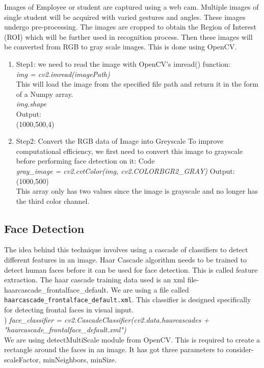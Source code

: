  Images of Employee or student are captured using a web cam. Multiple images of single student will be acquired with varied gestures and  angles.  These  images  undergo  pre-processing.  The images  are cropped  to obtain  the  Region of  Interest (ROI) which will be further used in recognition process. Then these  images  will  be  converted  from  RGB  to  gray  scale images. This is done using OpenCV. 
\begin{enumerate}
    \item Step1: we need to read the image with OpenCV’s imread() function:
    \\
  \emph{img = cv2.imread(imagePath)} \\
    This will load the image from the specified file path and return it in the form of a Numpy array. \\
   \emph{img.shape} \\
    Output:\\
    (1000,500,4)
    \item Step2: Convert the RGB data of Image into Greyscale
    To improve computational efficiency, we first need to convert this image to grayscale before performing face detection on it:
    Code \\
   \emph{gray\_image = cv2.cvtColor(img, cv2.COLORBGR2\_GRAY)} 
    Output:
    \\
    (1000,500)\\
    This array only has two values since the image is grayscale and no longer has the third color channel.
\end{enumerate}

  \subsection{Face Detection}
  The idea behind this technique involves using a cascade of classifiers to detect different features in an image. Haar Cascade algorithm needs to be trained to  detect human  faces before it can be used for  face detection. This is called feature extraction. The haar cascade training  data  used  is  an  xml  file- haarcascade\_frontalface\_default. We are using a file called \verb|haarcascade_frontalface_default.xml|. This classifier is designed specifically for detecting frontal faces in visual input.
  \\
)
   \emph{   face\_classifier = cv2.CascadeClassifier(cv2.data.haarcascades + "haarcascade\_frontalface\_default.xml")}
\\
  We are using detectMultiScale module from OpenCV. This is required to create a rectangle around  the faces  in an image.  It has got three  parameters to  consider-  scaleFactor, minNeighbors, minSize.

